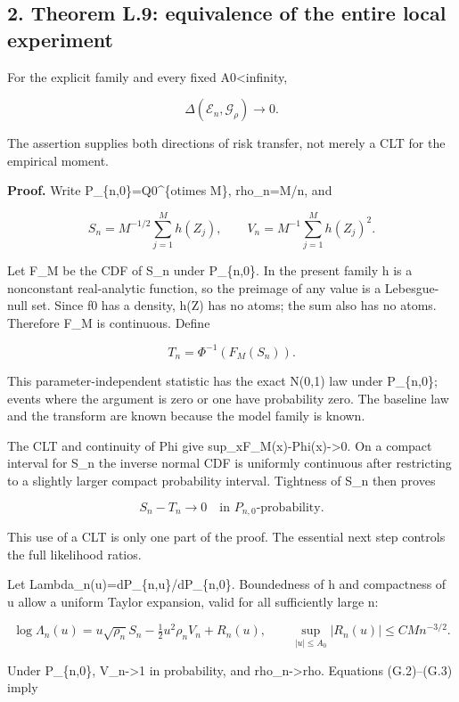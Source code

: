 \subsection{2. Theorem L.9: equivalence of the entire local
experiment}\label{gaussian_decision-theorem-l.9-equivalence-of-the-entire-local-experiment}

For the explicit family and every fixed A0\textless infinity,

\[
\boxed{\Delta(\mathcal E_n,\mathcal G_\rho)\to0.}
\tag{G.1}
\]

The assertion supplies both directions of risk transfer, not merely a
CLT for the empirical moment.

\textbf{Proof.} Write P\_\{n,0\}=Q0\^{}\{otimes M\}, rho\_n=M/n, and

\[
S_n=M^{-1/2}\sum_{j=1}^M h(Z_j),\qquad
V_n=M^{-1}\sum_{j=1}^M h(Z_j)^2.
\]

Let F\_M be the CDF of S\_n under P\_\{n,0\}. In the present family h is
a nonconstant real-analytic function, so the preimage of any value is a
Lebesgue-null set. Since f0 has a density, h(Z) has no atoms; the sum
also has no atoms. Therefore F\_M is continuous. Define

\[
T_n=\Phi^{-1}(F_M(S_n)).
\]

This parameter-independent statistic has the exact N(0,1) law under
P\_\{n,0\}; events where the argument is zero or one have probability
zero. The baseline law and the transform are known because the model
family is known.

The CLT and continuity of Phi give
sup\_x\textbar F\_M(x)-Phi(x)\textbar-\textgreater0. On a compact
interval for S\_n the inverse normal CDF is uniformly continuous after
restricting to a slightly larger compact probability interval. Tightness
of S\_n then proves

\[
S_n-T_n\longrightarrow0\quad\text{in }P_{n,0}\text{-probability}.
\tag{G.2}
\]

This use of a CLT is only one part of the proof. The essential next step
controls the full likelihood ratios.

Let Lambda\_n(u)=dP\_\{n,u\}/dP\_\{n,0\}. Boundedness of h and
compactness of u allow a uniform Taylor expansion, valid for all
sufficiently large n:

\[
\log\Lambda_n(u)
=u\sqrt{\rho_n}S_n-\tfrac12u^2\rho_n V_n+R_n(u),
\qquad
\sup_{|u|\le A_0}|R_n(u)|\le C M n^{-3/2}.
\tag{G.3}
\]

Under P\_\{n,0\}, V\_n-\textgreater1 in probability, and
rho\_n-\textgreater rho. Equations (G.2)--(G.3) imply

